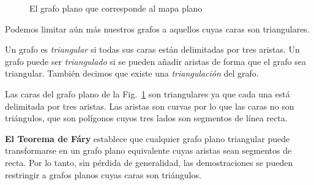 \begin{figure}[t]
\begin{minipage}{.45\textwidth}
\begin{center}
\caption{El grafo plano que corresponde al mapa plano}\label{f.five-planar-graph-graph}
\end{center}
\end{minipage}
\end{figure}

Podemos limitar aún más nuestros grafos a aquellos cuyas caras son triangulares.

\begin{definition}
Un grafo es \emph{triangular} si todas sus caras están delimitadas por tres aristas. Un grafo puede ser \emph{triangulado} si se pueden añadir aristas de forma que el grafo sea triangular. También decimos que existe una \emph{triangulación} del grafo.
\end{definition}

\begin{example}
Las caras del grafo plano de la Fig.~\ref{f.five-planar-graph-graph} son triangulares ya que cada una está delimitada por tres aristas. Las aristas son curvas por lo que las caras no son triángulos, que son polígonos cuyos tres lados son segmentos de línea recta.
\end{example}

\begin{advanced}
\textbf{El Teorema de F\'{a}ry} establece que cualquier grafo plano triangular puede transformarse en un grafo plano equivalente cuyas aristas sean segmentos de recta. Por lo tanto, sin pérdida de generalidad, las demostraciones se pueden restringir a grafos planos cuyas caras son triángulos.
\end{advanced}

